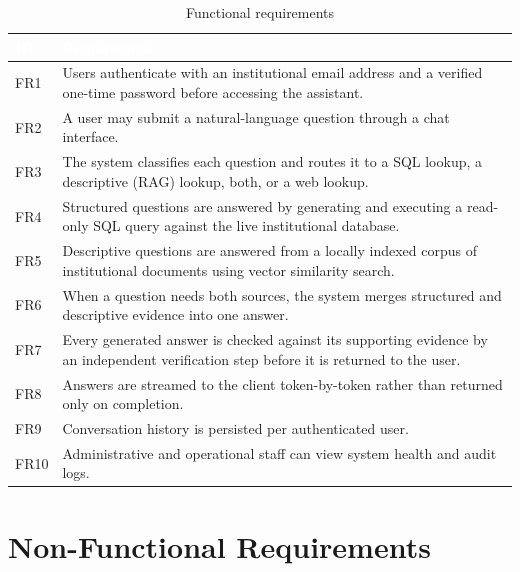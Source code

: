 \documentclass[11pt,a4paper,oneside]{report}
\begin{document}
\begin{table}[h]
\centering
\caption{Functional requirements}
\renewcommand{\arraystretch}{1.3}
\begin{tabularx}{\linewidth}{|l|X|}
\hline
\rowcolor{hdrnavy}
\textcolor{white}{ID} & \textcolor{white}{Requirement} \\
\hline
FR1 & Users authenticate with an institutional email address and a
      verified one-time password before accessing the assistant. \\
\hline
FR2 & A user may submit a natural-language question through a chat
      interface. \\
\hline
FR3 & The system classifies each question and routes it to a SQL
      lookup, a descriptive (RAG) lookup, both, or a web lookup. \\
\hline
FR4 & Structured questions are answered by generating and executing a
      read-only SQL query against the live institutional database. \\
\hline
FR5 & Descriptive questions are answered from a locally indexed
      corpus of institutional documents using vector similarity search. \\
\hline
FR6 & When a question needs both sources, the system merges structured
      and descriptive evidence into one answer. \\
\hline
FR7 & Every generated answer is checked against its supporting evidence
      by an independent verification step before it is returned to the
      user. \\
\hline
FR8 & Answers are streamed to the client token-by-token rather than
      returned only on completion. \\
\hline
FR9 & Conversation history is persisted per authenticated user. \\
\hline
FR10 & Administrative and operational staff can view system health and
       audit logs. \\
\hline
\end{tabularx}
\end{table}

\section{Non-Functional Requirements}
\end{document}
